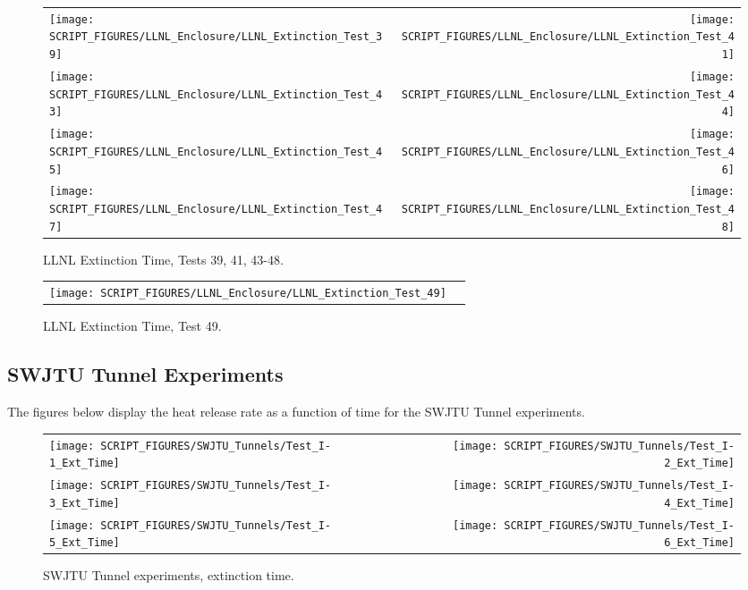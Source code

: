 \begin{figure}[p]
\begin{tabular*}{\textwidth}{l@{\extracolsep{\fill}}r}
\texttt{[image: SCRIPT\_FIGURES/LLNL\_Enclosure/LLNL\_Extinction\_Test\_39]} &
\texttt{[image: SCRIPT\_FIGURES/LLNL\_Enclosure/LLNL\_Extinction\_Test\_41]} \\
\texttt{[image: SCRIPT\_FIGURES/LLNL\_Enclosure/LLNL\_Extinction\_Test\_43]} &
\texttt{[image: SCRIPT\_FIGURES/LLNL\_Enclosure/LLNL\_Extinction\_Test\_44]} \\
\texttt{[image: SCRIPT\_FIGURES/LLNL\_Enclosure/LLNL\_Extinction\_Test\_45]} &
\texttt{[image: SCRIPT\_FIGURES/LLNL\_Enclosure/LLNL\_Extinction\_Test\_46]} \\
\texttt{[image: SCRIPT\_FIGURES/LLNL\_Enclosure/LLNL\_Extinction\_Test\_47]} &
\texttt{[image: SCRIPT\_FIGURES/LLNL\_Enclosure/LLNL\_Extinction\_Test\_48]}
\end{tabular*}
\caption{LLNL Extinction Time, Tests 39, 41, 43-48.}
\label{LLNL_Extinction_3}
\end{figure}

\begin{figure}[p]
\begin{tabular*}{\textwidth}{l@{\extracolsep{\fill}}r}
\texttt{[image: SCRIPT\_FIGURES/LLNL\_Enclosure/LLNL\_Extinction\_Test\_49]} &
\end{tabular*}
\caption{LLNL Extinction Time, Test 49.}
\label{LLNL_Extinction_4}
\end{figure}

\clearpage


\subsection{SWJTU Tunnel Experiments}

The figures below display the heat release rate as a function of time for the SWJTU Tunnel experiments. 

\begin{figure}[!h]
\begin{tabular*}{\textwidth}{l@{\extracolsep{\fill}}r}
\texttt{[image: SCRIPT\_FIGURES/SWJTU\_Tunnels/Test\_I-1\_Ext\_Time]} &
\texttt{[image: SCRIPT\_FIGURES/SWJTU\_Tunnels/Test\_I-2\_Ext\_Time]} \\
\texttt{[image: SCRIPT\_FIGURES/SWJTU\_Tunnels/Test\_I-3\_Ext\_Time]} &
\texttt{[image: SCRIPT\_FIGURES/SWJTU\_Tunnels/Test\_I-4\_Ext\_Time]} \\
\texttt{[image: SCRIPT\_FIGURES/SWJTU\_Tunnels/Test\_I-5\_Ext\_Time]} &
\texttt{[image: SCRIPT\_FIGURES/SWJTU\_Tunnels/Test\_I-6\_Ext\_Time]} 
\end{tabular*}
\caption[SWJTU Tunnel experiments, extinction time]{SWJTU Tunnel experiments, extinction time.}
\label{SWJTU_Extinction}
\end{figure}


